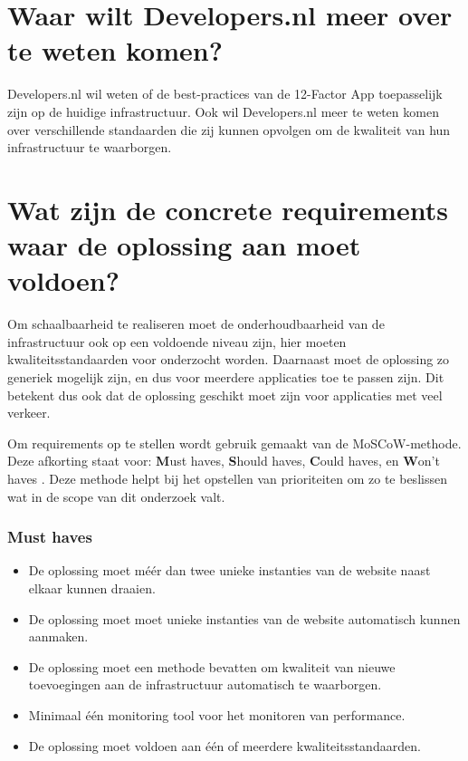 \section{Waar wilt Developers.nl meer over te weten komen?}

Developers.nl wil weten of de best-practices van de 12-Factor App toepasselijk zijn op de huidige infrastructuur. Ook wil Developers.nl meer te weten komen over verschillende standaarden die zij kunnen opvolgen om de kwaliteit van hun infrastructuur te waarborgen.

\section{Wat zijn de concrete requirements waar de oplossing aan moet voldoen?}

Om schaalbaarheid te realiseren moet de onderhoudbaarheid van de infrastructuur ook op een voldoende niveau zijn, hier moeten kwaliteitsstandaarden voor onderzocht worden. Daarnaast moet de oplossing zo generiek mogelijk zijn, en dus voor meerdere applicaties toe te passen zijn. Dit betekent dus ook dat de oplossing geschikt moet zijn voor applicaties met veel verkeer.

Om requirements op te stellen wordt gebruik gemaakt van de MoSCoW-methode. Deze afkorting staat voor: \textbf{M}ust haves, \textbf{S}hould haves, \textbf{C}ould haves, en \textbf{W}on't haves \parencite{Moscow}. Deze methode helpt bij het opstellen van prioriteiten om zo te beslissen wat in de scope van dit onderzoek valt.

\subsubsection{Must haves}
\begin{itemize}
	\item De oplossing moet méér dan twee unieke instanties van de website naast elkaar kunnen draaien.
	\item De oplossing moet moet unieke instanties van de website automatisch kunnen aanmaken.
	\item De oplossing moet een methode bevatten om kwaliteit van nieuwe toevoegingen aan de infrastructuur automatisch te waarborgen.
	\item Minimaal één monitoring tool voor het monitoren van performance.
	\item De oplossing moet voldoen aan één of meerdere kwaliteitsstandaarden.
\end{itemize}

